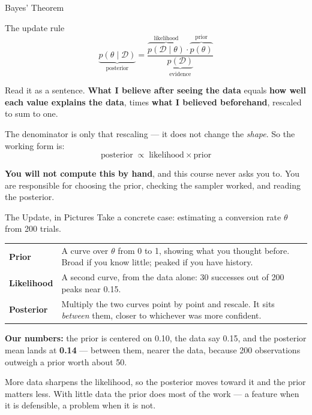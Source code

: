 \documentclass[aspectratio=169, 11pt]{beamer}
\begin{document}
\begin{frame}{Bayes' Theorem \parencite{Gelman2013}}
  \begin{definitionbox}{The update rule}
    \[
      \underbrace{p(\theta \mid \mathcal{D})}_{\text{posterior}}
      = \frac{\overbrace{p(\mathcal{D} \mid \theta)}^{\text{likelihood}}
              \cdot \overbrace{p(\theta)}^{\text{prior}}}
             {\underbrace{p(\mathcal{D})}_{\text{evidence}}}
    \]
  \end{definitionbox}

  Read it as a sentence. \textbf{What I believe after seeing the data} equals \textbf{how well
  each value explains the data}, times \textbf{what I believed beforehand}, rescaled to sum to one.

  \vspace{0.1cm}
  The denominator is only that rescaling --- it does not change the \emph{shape}. So the working
  form is:
  \[
    \text{posterior} \;\propto\; \text{likelihood} \times \text{prior}
  \]
  \vspace{-0.3cm}

  \textbf{You will not compute this by hand}, and this course never asks you to. You are
  responsible for choosing the prior, checking the sampler worked, and reading the posterior.
\end{frame}

\begin{frame}{The Update, in Pictures}
  Take a concrete case: estimating a conversion rate $\theta$ from 200 trials.

  \vspace{0.1cm}
  \begin{center}
    {\small
    \begin{tabular}{p{2.6cm}p{9.9cm}}
      \toprule
      \textbf{Prior} & A curve over $\theta$ from 0 to 1, showing what you thought before. Broad
      if you know little; peaked if you have history. \\[3pt]
      \textbf{Likelihood} & A second curve, from the data alone: 30 successes out of 200 peaks
      near 0.15. \\[3pt]
      \textbf{Posterior} & Multiply the two curves point by point and rescale. It sits
      \emph{between} them, closer to whichever was more confident. \\
      \bottomrule
    \end{tabular}
    }
  \end{center}

  \textbf{Our numbers:} the prior is centered on 0.10, the data say 0.15, and the posterior mean
  lands at \textbf{0.14} --- between them, nearer the data, because 200 observations outweigh a
  prior worth about 50.

  \vspace{0.1cm}
  More data sharpens the likelihood, so the posterior moves toward it and the prior matters less.
  With little data the prior does most of the work --- a feature when it is defensible, a problem
  when it is not.
\end{frame}
\end{document}
